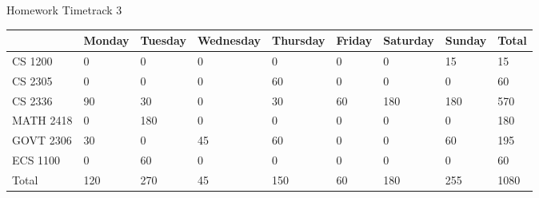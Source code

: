 \documentclass [11pt] {article}
\begin{document}
\begin {center}

    Homework Timetrack 3 \\

    \begin {tabular} {|l|l|l|l|l|l|l|l|l|}

        \hline
                    & Monday    & Tuesday   & Wednesday     & Thursday  & Friday    & Saturday  & Sunday    & Total \\ 
        \hline
        CS 1200     & 0         & 0         & 0             & 0         & 0         & 0         & 15        & 15    \\
        \hline
        CS 2305     & 0         & 0         & 0             & 60        & 0         & 0         & 0         & 60    \\
        \hline
        CS 2336     & 90        & 30        & 0             & 30        & 60        & 180       & 180       & 570   \\
        \hline
        MATH 2418   & 0         & 180       & 0             & 0         & 0         & 0         & 0         & 180   \\
        \hline
        GOVT 2306   & 30        & 0         & 45            & 60        & 0         & 0         & 60        & 195   \\
        \hline
        ECS 1100    & 0         & 60        & 0             & 0         & 0         & 0         & 0         & 60    \\
        \hline
        Total       & 120       & 270       & 45            & 150       & 60        & 180       & 255       & 1080  \\
        \hline

    \end {tabular}	

\end {center}
\end{document}
